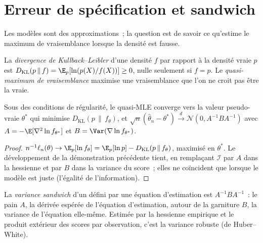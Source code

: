 \section{Erreur de spécification et sandwich}

Les modèles sont des approximations~; la question est de savoir ce qu'estime le maximum de vraisemblance lorsque la densité est fausse.

\begin{definition}\label{def:qm:estimation:kl}
La \emph{divergence de Kullback--Leibler} d'une densité $f$ par rapport à la densité vraie $p$
est $D_{\mathrm{KL}}(p\,\|\,f) = \E_p[\ln(p(X)/f(X))] \ge 0$, nulle seulement si $f = p$. Le \emph{quasi-maximum
de vraisemblance} maximise une vraisemblance que l'on ne croit pas être la vraie.
\end{definition}

\begin{proposition}\label{prop:qm:estimation:qmle}
Sous des conditions de régularité, le quasi-MLE converge vers la valeur pseudo-vraie $\theta^*$ qui minimise $D_{\mathrm{KL}}(p\,\|\,f_\theta)$,
et $\sqrt n(\hat\theta_n - \theta^*) \xrightarrow{d} \mathcal N(0, A^{-1}BA^{-1})$ avec $A = -\E[\nabla^2\ln f_{\theta^*}]$ et $B = \Var(\nabla\ln
f_{\theta^*})$.
\end{proposition}

\begin{proof}
$n^{-1}\ell_n(\theta) \to \E_p[\ln f_\theta] = \E_p[\ln p] - D_{\mathrm{KL}}(p\,\|\,f_\theta)$, maximisé en $\theta^*$. Le développement de la
démonstration précédente tient, en remplaçant $\mathcal I$ par $A$ dans la hessienne et par $B$ dans la variance du score~; elles ne coïncident que lorsque
le modèle est juste (l'égalité de l'information).
\end{proof}

\begin{definition}\label{def:qm:estimation:sandwich}
La \emph{variance sandwich} d'un  défini par une équation d'estimation est $A^{-1}BA^{-1}$~:
le pain $A$, la dérivée espérée de l'équation d'estimation, autour de la garniture $B$, la variance de l'équation
elle-même. Estimée par la hessienne empirique et le produit extérieur des scores par observation, c'est la variance robuste
(de Huber--White).
\end{definition}

